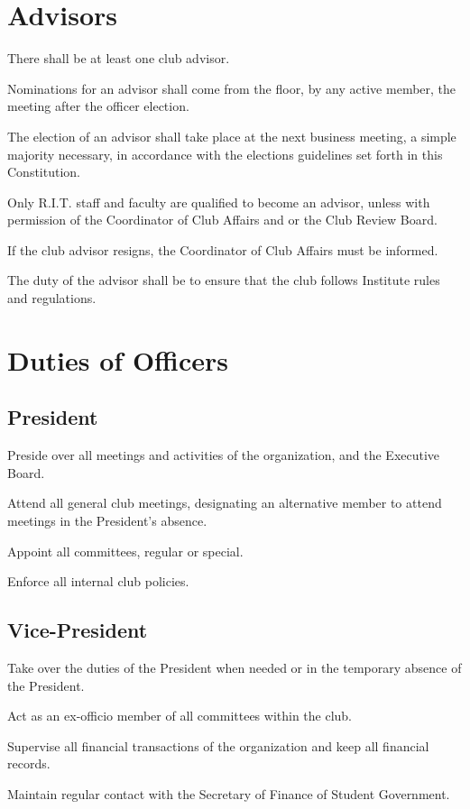 \section{Advisors}
\begin{subroutines}
\item There shall be at least one club advisor.
\item Nominations for an advisor shall come from the floor, by any active member, the meeting after the officer election.
\item The election of an advisor shall take place at the next business meeting, a simple majority necessary, in accordance with the elections guidelines set forth in this Constitution.
\item Only R.I.T. staff and faculty are qualified to become an advisor, unless with permission of the Coordinator of Club Affairs and or the Club Review Board.
\item If the club advisor resigns, the Coordinator of Club Affairs must be informed.
\item The duty of the advisor shall be to ensure that the club follows Institute rules and regulations.
\end{subroutines}

\section{Duties of Officers}
\subsection{President}
\begin{subroutines}
	\item Preside over all meetings and activities of the organization, and the Executive Board.
	\item Attend all general club meetings, designating an alternative member to attend meetings in the President's absence.
	\item Appoint all committees, regular or special.
	\item Enforce all internal club policies.
\end{subroutines}
\subsection{Vice-President}
\begin{subroutines}
	\item Take over the duties of the President when needed or in the temporary absence of the President.
	\item Act as an ex-officio member of all committees within the club.
	\item Supervise all financial transactions of the organization and keep all financial records.
	\item Maintain regular contact with the Secretary of Finance of Student Government.
\end{subroutines}
